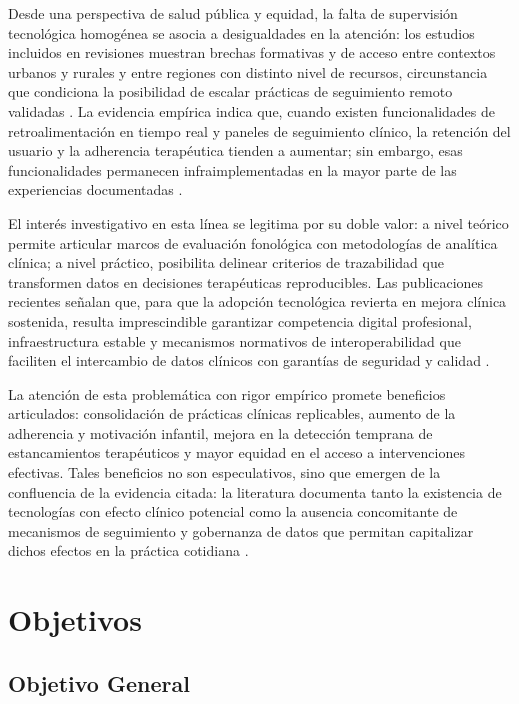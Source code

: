 \documentclass[12pt, oneside]{article}
\begin{document}
Desde una perspectiva de salud pública y equidad, la falta de supervisión tecnológica homogénea se asocia a desigualdades en la atención: los estudios incluidos en revisiones muestran brechas formativas y de acceso entre contextos urbanos y rurales y entre regiones con distinto nivel de recursos, circunstancia que condiciona la posibilidad de escalar prácticas de seguimiento remoto validadas \parencite{Rettinger2023,Guglani2023}. La evidencia empírica indica que, cuando existen funcionalidades de retroalimentación en tiempo real y paneles de seguimiento clínico, la retención del usuario y la adherencia terapéutica tienden a aumentar; sin embargo, esas funcionalidades permanecen infraimplementadas en la mayor parte de las experiencias documentadas \parencite{Rettinger2023,Kim2023}.

El interés investigativo en esta línea se legitima por su doble valor: a nivel teórico permite articular marcos de evaluación fonológica con metodologías de analítica clínica; a nivel práctico, posibilita delinear criterios de trazabilidad que transformen datos en decisiones terapéuticas reproducibles. Las publicaciones recientes señalan que, para que la adopción tecnológica revierta en mejora clínica sostenida, resulta imprescindible garantizar competencia digital profesional, infraestructura estable y mecanismos normativos de interoperabilidad que faciliten el intercambio de datos clínicos con garantías de seguridad y calidad \parencite{Leinweber2023,ONC2024HTI1}.

La atención de esta problemática con rigor empírico promete beneficios articulados: consolidación de prácticas clínicas replicables, aumento de la adherencia y motivación infantil, mejora en la detección temprana de estancamientos terapéuticos y mayor equidad en el acceso a intervenciones efectivas. Tales beneficios no son especulativos, sino que emergen de la confluencia de la evidencia citada: la literatura documenta tanto la existencia de tecnologías con efecto clínico potencial como la ausencia concomitante de mecanismos de seguimiento y gobernanza de datos que permitan capitalizar dichos efectos en la práctica cotidiana \parencite{Gijbels2024,Berisha2024,Kim2023}.

\section{Objetivos}
\subsection{Objetivo General}
\end{document}
